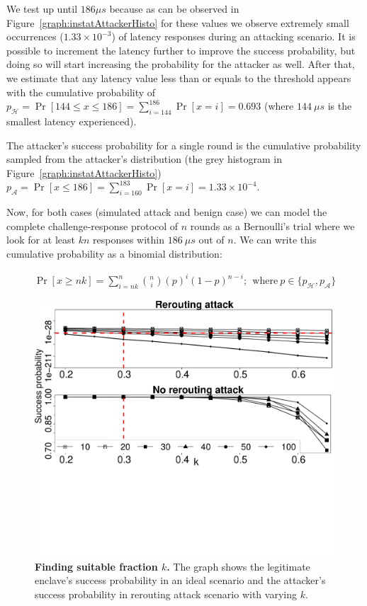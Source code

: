 We test \connect up until $186 \mu s$ because as can be observed in Figure~\ref{graph:instatAttackerHisto} for these values we observe extremely small occurrences ($1.33\times10^{-3}$) of latency responses during an attacking scenario. It is possible to increment the latency further to improve the success probability, but doing so will start increasing the probability for the attacker as well. 
%
After that, we estimate that any latency value less than or equals to the threshold \connect appears with the cumulative probability of $p_{\mathcal{H}} = \Pr[144\leq x \leq 186] = \sum_{i=144}^{186}\Pr[x=i] = 0.693$ (where $144\ \mu s$ is the smallest latency experienced).

The attacker's success probability for a single round is the cumulative probability sampled from the attacker's distribution (the grey histogram in Figure~\ref{graph:instatAttackerHisto}) $p_\mathcal{A} = \Pr[x \leq 186] = \sum_{i=160}^{183}\Pr[x=i] = 1.33 \times 10^{-4}$.


Now, for both cases (simulated attack and benign case) we can model the complete challenge-response protocol of $n$ rounds as a Bernoulli's trial where we look for at least $kn$ responses within $186\ \mu s$ out of $n$. We can write this cumulative probability as a binomial distribution:
%

\begin{align*}
    \Pr[x \geq nk] = \sum_{i=nk}^n\binom{n}{i} (p)^{i}(1-p)^{n-i};~~\text{where}~ p \in \{p_\mathcal{H}, p_\mathcal{A}\}
\end{align*}

\begin{figure}[t]
  \centering
    \includegraphics[trim={0 10cm 0 0}, clip, width=\linewidth]{chapters/ProximiTEE/data/fx3_data/round_comp_new.pdf}
    \caption[Finding suitable fraction $k$]{\textbf{Finding suitable fraction $k$.} The graph shows the legitimate enclave's success probability in an ideal scenario and the attacker's success probability in rerouting attack scenario with varying $k$.}
    \label{graph:roundSuccess}
\end{figure}



